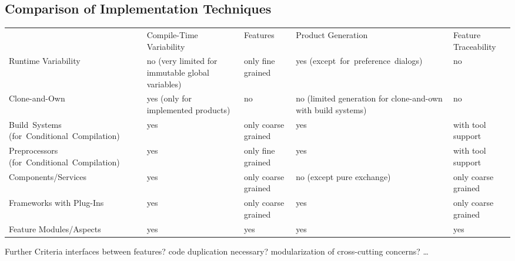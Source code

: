\subsection{Comparison of Implementation Techniques}
\begin{frame}[fragile]{\myframetitle}
	\centering
	\renewcommand{\arraystretch}{1.2}
	\newcommand{\myexception}[1]{\tiny{}(#1)}
	\begin{tabular}{p{32mm}p{32mm}p{14mm}p{27mm}p{14mm}}
		 & Compile-Time Variability & Features & Product Generation & Feature \mbox{Traceability} \pause\\\rowcolor{gray}
		Runtime Variability & no \myexception{very limited for immutable global variables} & only fine grained & yes \mbox{\myexception{except for preference dialogs}} & no \pause\\
		Clone-and-Own & yes \linebreak\myexception{only for implemented products} & no & no \myexception{limited generation for clone-and-own with build systems} & no \pause\\\rowcolor{gray}
		\mbox{Build Systems} \mbox{\myexception{for Conditional Compilation}} & yes & only coarse grained & yes & with tool support \pause\\
		Preprocessors \mbox{\myexception{for Conditional Compilation}} & yes & only fine grained & yes & with tool support \pause\\\rowcolor{gray}
		Components/Services & yes & only coarse grained & no \linebreak\myexception{except pure exchange} & only coarse grained \pause\\
		Frameworks with Plug-Ins & yes & only coarse grained & yes & only coarse grained \pause\\\rowcolor{gray}
		Feature Modules/Aspects & yes & yes & yes & yes \pause\\
	\end{tabular}
	\begin{note}{Further Criteria}
		interfaces between features? code duplication necessary? modularization of cross-cutting concerns? \ldots
	\end{note}
\end{frame}

